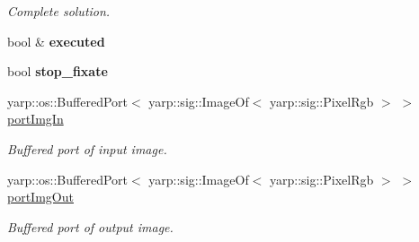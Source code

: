 \begin{DoxyCompactItemize}
\begin{DoxyCompactList}\small\item\em Complete solution. \end{DoxyCompactList}\item 
bool \& {\bfseries executed}\label{classGraspVisualization_ac1c748f2c0bbb38c4ea19216cb4dbfc8}

\item 
bool {\bfseries stop\+\_\+fixate}\label{classGraspVisualization_ad26b15866f86df9e9c2ec59658cfdd80}

\item 
yarp\+::os\+::\+Buffered\+Port$<$ yarp\+::sig\+::\+Image\+Of$<$ yarp\+::sig\+::\+Pixel\+Rgb $>$ $>$ \hyperlink{classGraspVisualization_a82ecdc743d9883336682ffd0e6b9c113}{port\+Img\+In}\label{classGraspVisualization_a82ecdc743d9883336682ffd0e6b9c113}

\begin{DoxyCompactList}\small\item\em Buffered port of input image. \end{DoxyCompactList}\item 
yarp\+::os\+::\+Buffered\+Port$<$ yarp\+::sig\+::\+Image\+Of$<$ yarp\+::sig\+::\+Pixel\+Rgb $>$ $>$ \hyperlink{classGraspVisualization_a9d9aab016248eb6eec902fed80e74d65}{port\+Img\+Out}\label{classGraspVisualization_a9d9aab016248eb6eec902fed80e74d65}

\begin{DoxyCompactList}\small\item\em Buffered port of output image. \end{DoxyCompactList}\end{DoxyCompactItemize}
